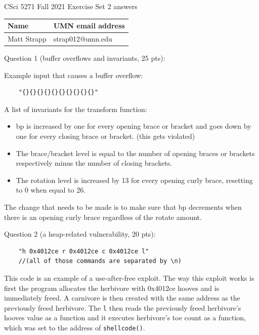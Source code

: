 \documentclass[11pt]{article}
\begin{document}
\begin{center}
CSci 5271 Fall 2021 Exercise Set 2 answers 
\end{center}
\graphicspath{{./}}

\vspace{10pt}

\begin{tabular}{|p{2.6in}|p{2.6in}|}\hline
Name & UMN email address\\\hline
Matt Strapp & strap012@umn.edu \\\hline
\end{tabular}

\vspace{10pt}

Question 1 (buffer overflows and invariants, 25 pts):

Example input that causes a buffer overflow:
\begin{verbatim}
    "{}{}{}{}{}{}{}{}{}{}"
\end{verbatim}

A list of invariants for the transform function:
\begin{itemize}
    \item bp is increased by one for every opening brace or bracket and goes down by one for every closing brace or bracket. (this gets violated)
    \item The brace/bracket level is equal to the number of opening braces or brackets respectively minus the number of closing brackets.
    \item The rotation level is increased by 13 for every opening curly brace, resetting to 0 when equal to 26.
\end{itemize}
The change that needs to be made is to make sure that bp decrements when there is an opening curly brace regardless of the rotate amount.

\newpage

Question 2 (a heap-related vulnerability, 20 pts):
\begin{verbatim}
    "h 0x4012ce r 0x4012ce c 0x4012ce l" 
    //(all of those commands are separated by \n)
\end{verbatim}

This code is an example of a use-after-free exploit. The way this exploit works is first the program allocates the herbivore with 0x4012ce hooves and is immediately freed. A carnivore is then created with the same address as the previously freed herbivore. The \verb|l| then reads the previously freed herbivore's hooves value as a function and it executes herbivore's toe count as a function, which was set to the address of \verb|shellcode()|.
\end{document}
